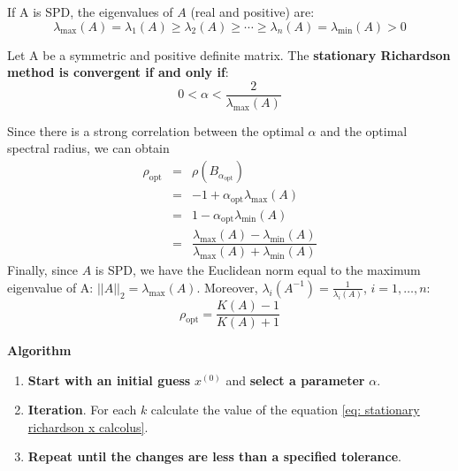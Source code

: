 \noindent
If A is SPD, the eigenvalues of $A$ (real and positive) are:
\begin{equation*}
    \lambda_{\max}\left(A\right) = \lambda_{1}\left(A\right) \ge \lambda_{2}\left(A\right) \ge \cdots \ge \lambda_{n}\left(A\right) = \lambda_{\min}\left(A\right) > 0
\end{equation*}
\begin{theorem}
    Let A be a symmetric and positive definite matrix. The \textbf{stationary Richardson method is convergent if and only if}:
    \begin{equation}
        0 < \alpha < \dfrac{2}{\lambda_{\max}\left(A\right)}
    \end{equation}
\end{theorem}

\noindent
Since there is a strong correlation between the optimal $\alpha$ and the optimal spectral radius, we can obtain
\begin{equation*}
    \begin{array}{rcl}
        \rho_{\text{opt}} &=& \rho\left(B_{\alpha_{\text{opt}}}\right) \\ [.3em]
        &=& -1+\alpha_{\text{opt}}\lambda_{\max}\left(A\right) \\ [.3em]
        &=& 1-\alpha_{\text{opt}}\lambda_{\min}\left(A\right) \\ [.3em]
        &=& \dfrac{
            \lambda_{\max}\left(A\right) - \lambda_{\min}\left(A\right)
        }{
            \lambda_{\max}\left(A\right) + \lambda_{\min}\left(A\right)
        }
    \end{array}
\end{equation*}
Finally, since $A$ is SPD, we have the Euclidean norm equal to the maximum eigenvalue of A: ${\left|\left|A\right|\right|}_{2} = \lambda_{\max}\left(A\right)$. Moreover, $\lambda_{i}\left(A^{-1}\right) = \frac{1}{\lambda_{i}\left(A\right)}$, $i = 1, \dots, n$:
\begin{equation}\label{eq: optimal sepctral radius}
    \rho_{\text{opt}} = \dfrac{
        K\left(A\right)-1
    }{
        K\left(A\right)+1
    }
\end{equation}

\begin{flushleft}
    \textcolor{Green3}{ \textbf{Algorithm}}
\end{flushleft}
\begin{enumerate}
    \item \textbf{Start with an initial guess} $x^{\left(0\right)}$ and \textbf{select a parameter} $\alpha$.
    \item \textbf{Iteration}. For each $k$ calculate the value of the equation \ref{eq: stationary richardson x calcolus}.
    \item \textbf{Repeat until the changes are less than a specified tolerance}.
\end{enumerate}

